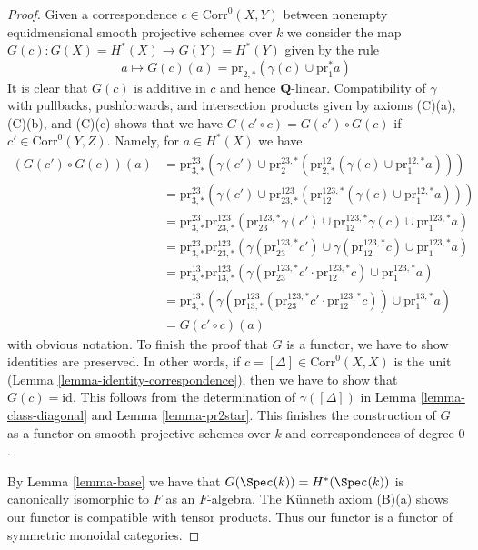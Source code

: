 \begin{proof}
\medskip\noindent
Given a correspondence $c \in \text{Corr}^0(X, Y)$ between
nonempty equidmensional smooth projective schemes over $k$
we consider the map $G(c) : G(X) = H^*(X) \to G(Y) = H^*(Y)$
given by the rule
$$
a \longmapsto
G(c)(a) = \text{pr}_{2, *}(\gamma(c) \cup \text{pr}_1^*a)
$$
It is clear that $G(c)$ is additive in $c$ and hence $\mathbf{Q}$-linear.
Compatibility of $\gamma$ with pullbacks, pushforwards, and
intersection products given by axioms (C)(a), (C)(b), and (C)(c)
shows that we have
$G(c' \circ c) = G(c') \circ G(c)$ if $c' \in \text{Corr}^0(Y, Z)$.
Namely, for $a \in H^*(X)$ we have
\begin{align*}
(G(c') \circ G(c))(a)
& =
\text{pr}^{23}_{3, *}(\gamma(c') \cup
\text{pr}^{23, *}_2(\text{pr}^{12}_{2, *}(\gamma(c) \cup
\text{pr}^{12, *}_1a))) \\
& =
\text{pr}^{23}_{3, *}(\gamma(c') \cup
\text{pr}^{123}_{23, *}(\text{pr}^{123, *}_{12}(\gamma(c) \cup
\text{pr}^{12, *}_1 a))) \\
& =
\text{pr}^{23}_{3, *}
\text{pr}^{123}_{23, *}(
\text{pr}^{123, *}_{23}\gamma(c') \cup
\text{pr}^{123, *}_{12}\gamma(c) \cup
\text{pr}^{123, *}_1 a) \\
& =
\text{pr}^{23}_{3, *}
\text{pr}^{123}_{23, *}(
\gamma(\text{pr}^{123, *}_{23}c') \cup
\gamma(\text{pr}^{123, *}_{12}c) \cup
\text{pr}^{123, *}_1 a) \\
& =
\text{pr}^{13}_{3, *}
\text{pr}^{123}_{13, *}(
\gamma(\text{pr}^{123, *}_{23}c' \cdot \text{pr}^{123, *}_{12}c) \cup
\text{pr}^{123, *}_1 a) \\
& =
\text{pr}^{13}_{3, *}(
\gamma(\text{pr}^{123}_{13, *}(\text{pr}^{123, *}_{23}c' \cdot \text{pr}^{123, *}_{12}c)) \cup
\text{pr}^{13, *}_1 a) \\
& =
G(c' \circ c)(a)
\end{align*}
with obvious notation. To finish the proof that $G$ is a functor,
we have to show identities are preserved. In other words, if
$c = [\Delta] \in \text{Corr}^0(X, X)$ is the unit
(Lemma \ref{lemma-identity-correspondence}), then we have to show that
$G(c) = \text{id}$. This follows from the determination
of $\gamma([\Delta])$ in Lemma \ref{lemma-class-diagonal}
and Lemma \ref{lemma-pr2star}.
This finishes the construction of $G$ as a functor on
smooth projective schemes over $k$ and correspondences of degree $0$.

\medskip\noindent
By Lemma \ref{lemma-base} we have that
$G(\Spec(k)) = H^*(\Spec(k))$ is canonically isomorphic to $F$
as an $F$-algebra. The K\"unneth axiom (B)(a)
shows our functor is compatible with tensor products.
Thus our functor is a functor of symmetric monoidal categories.


\end{proof}
